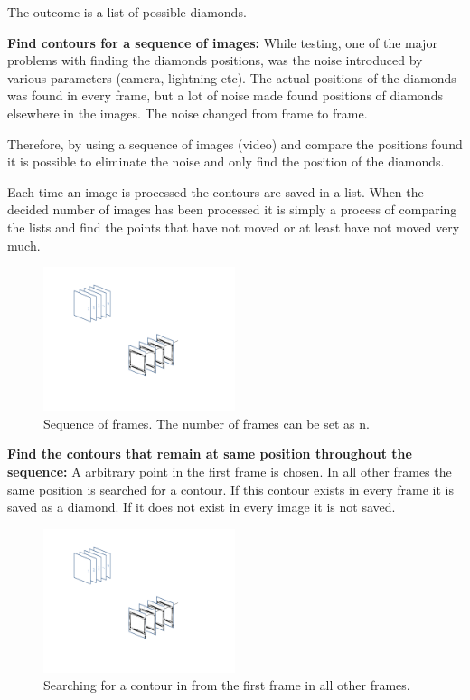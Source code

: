The outcome is a list of possible diamonds.

\textbf{Find contours for a sequence of images:}
While testing, one of the major problems with finding the diamonds positions, was the noise introduced by various parameters (camera, lightning etc). The actual positions of the diamonds was found in every frame, but a lot of noise made found positions of diamonds elsewhere in the images. 
The noise changed from frame to frame.

Therefore, by using a sequence of images (video) and compare the positions found it is possible to eliminate the noise and only find the position of the diamonds.

Each time an image is processed the contours are saved in a list. When the decided number of images has been processed it is simply a process of comparing the lists and find the points that have not moved or at least have not moved very much.

\begin{figure}[htpb]
\begin{center}
\leavevmode
\includegraphics[width=0.5\textwidth]{images/image_seq_numbers.pdf}
\end{center}
\caption{Sequence of frames. The number of frames can be set as n.}
\label{fig:seq_img}
\end{figure}

\textbf{Find the contours that remain at same position throughout the sequence:}
A arbitrary point in the first frame is chosen. In all other frames the same position is searched for a contour. If this contour exists in every frame it is saved as a diamond. If it does not exist in every image it is not saved.

\begin{figure}[htpb]
\begin{center}
\leavevmode
\includegraphics[width=0.5\textwidth]{images/image_seq_pool.pdf}
\end{center}
\caption{Searching for a contour in from the first frame in all other frames.}
\label{fig:seq_img_pool}
\end{figure}

